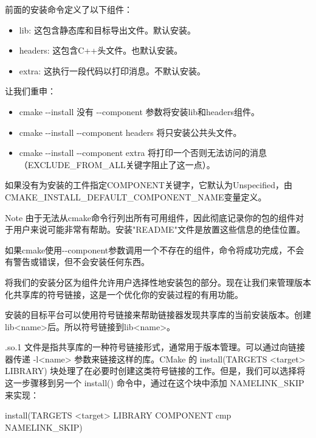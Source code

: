 前面的安装命令定义了以下组件：

\begin{itemize}
\item
lib: 这包含静态库和目标导出文件。默认安装。

\item
headers: 这包含C++头文件。也默认安装。

\item
extra: 这执行一段代码以打印消息。不默认安装。
\end{itemize}

让我们重申：

\begin{itemize}
\item
cmake -{}-install 没有 -{}-component 参数将安装lib和headers组件。

\item
cmake -{}-install -{}-component headers 将只安装公共头文件。

\item
cmake -{}-install -{}-component extra 将打印一个否则无法访问的消息（EXCLUDE\_FROM\_ALL关键字阻止了这一点）。
\end{itemize}

如果没有为安装的工件指定COMPONENT关键字，它默认为Unspecified，由CMAKE\_INSTALL\_DEFAULT\_COMPONENT\_NAME变量定义。

\begin{myNotic}{Note}
由于无法从cmake命令行列出所有可用组件，因此彻底记录你的包的组件对于用户来说可能非常有帮助。安装"README"文件是放置这些信息的绝佳位置。
\end{myNotic}

如果cmake使用-{}-component参数调用一个不存在的组件，命令将成功完成，不会有警告或错误，但不会安装任何东西。

将我们的安装分区为组件允许用户选择性地安装包的部分。现在让我们来管理版本化共享库的符号链接，这是一个优化你的安装过程的有用功能。


安装的目标平台可以使用符号链接来帮助链接器发现共享库的当前安装版本。创建lib<name>后。所以符号链接到lib<name>。

.so.1 文件是指共享库的一种符号链接形式，通常用于版本管理。可以通过向链接器传递 -l<name> 参数来链接这样的库。CMake 的 install(TARGETS <target> LIBRARY) 块处理了在必要时创建这类符号链接的工作。但是，我们可以选择将这一步骤移到另一个 install() 命令中，通过在这个块中添加 NAMELINK\_SKIP 来实现：

\begin{shell}
install(TARGETS <target> LIBRARY
        COMPONENT cmp NAMELINK_SKIP)
\end{shell}

